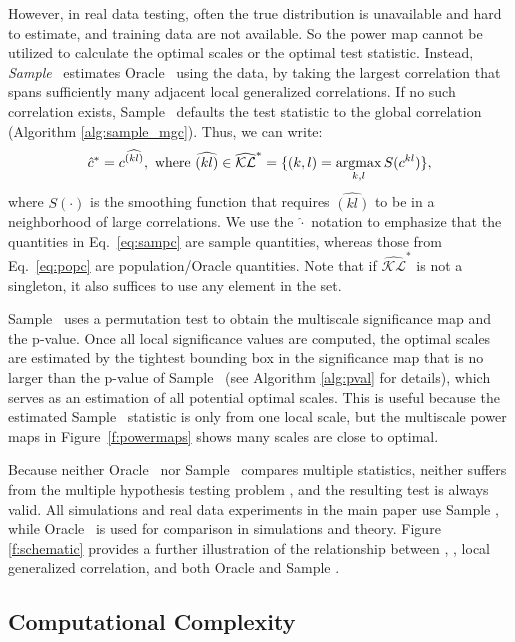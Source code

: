 \documentclass[11pt]{article}
\begin{document}
However, in real data testing, often the true distribution is unavailable and hard to estimate, and training data are not available. 
So the power map cannot be utilized to calculate the optimal scales or the optimal test statistic.
Instead, \emph{Sample} \Mgc~estimates Oracle \Mgc~using the data, by taking the largest correlation that spans sufficiently many adjacent local generalized correlations. 
If no such correlation exists, Sample \Mgc~defaults the test statistic to the global correlation (Algorithm \ref{alg:sample_mgc}).
Thus, we can write:
\begin{equation} \label{eq:sampc}
\hat{\GG}^{*} =  c^{\widehat{(kl)}}, \text{ where } \widehat{(kl)} \in \widehat{\mathcal{KL}}^*  =\{(k,l)=\argmax_{k,l}S(\GG^{kl})\},
\end{equation}
where $S(\cdot)$ is the smoothing function that requires $\widehat{(kl)}$ to be in a neighborhood of large correlations. We use the $\hat{\cdot}$ notation to emphasize that the quantities in Eq.~\ref{eq:sampc} are sample quantities, whereas those from Eq.~\ref{eq:popc} are population/Oracle quantities. Note that if $\widehat{\mathcal{KL}}^*$ is not a singleton, it also suffices to use any element in the set.

Sample \Mgc~uses a permutation test to obtain the multiscale significance map and the p-value. 
% 
Once all local significance values are computed, the optimal scales are estimated by the tightest bounding box in the significance map that is no larger than the p-value of Sample \Mgc~(see Algorithm \ref{alg:pval} for details), which serves as an estimation of all potential optimal scales. This is useful because the estimated Sample \Mgc~statistic is only from one local scale, but the multiscale power maps in Figure~\ref{f:powermaps}  shows many scales are close to optimal.

Because neither  Oracle \Mgc~nor Sample \Mgc~compares multiple statistics, neither suffers from the multiple hypothesis testing problem \cite{Benjamini1995}, and the resulting test is always valid. All simulations and real data experiments in the main paper use Sample \Mgc,  while Oracle \Mgc~is used for comparison in simulations and theory. Figure \ref{f:schematic} provides a further illustration of the relationship between \Mantel, \Mcorr, local generalized correlation, and both Oracle and Sample \Mgc.

\subsection{Computational Complexity}
\end{document}
